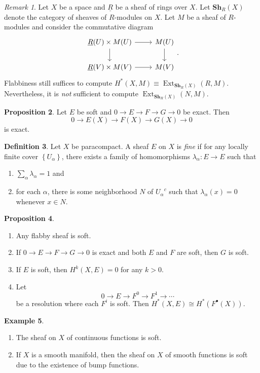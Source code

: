 \documentclass[10pt,letterpaper,cm]{nupset}
\theoremstyle{definition}
\newtheorem{definition}{Definition}[subsection]
\newtheorem{exmp}[definition]{Example}
\theoremstyle{theorem}
\newtheorem{prop}[definition]{Proposition}
\theoremstyle{remark}
\newtheorem{remark}[definition]{Remark}
\newcommand{\1}{\mathbb{1}}
\newcommand{\0}{\vec 0}
\DeclareMathOperator{\ext}{Ext}
\begin{document}
\begin{remark}
Let $X$ be a space and $\underline{R}$ be a sheaf of rings over $X$. Let $\mathbf{Sh}_R(X)$ denote the category of sheaves of $R$-modules on $X$. Let $M$ be a sheaf of $R$-modules and consider the commutative diagram
\[
\begin{tikzcd}
\underline{R}(U) \times M(U) \arrow[r] \arrow[d] &  M(U) \arrow[d] \\
 \underline{R}(V) \times M(V) \arrow[r]          & M(V)           
\end{tikzcd}
.\]
Flabbiness still suffices to compute $H^{\ast}(X, M) \equiv \ext_{\mathbf{Sh}_R(X)}(R, M)$. Nevertheless, it is \emph{not} sufficient to compute $\ext_{\mathbf{Sh}_R(X)}(N, M)$.
\end{remark}

\begin{prop}
Let $E$ be soft and $0 \to E \to F \to G \to 0$ be exact. Then $$0 \to E(X) \to F(X) \to G(X) \to 0$$ is exact.
\end{prop}

\begin{definition}
Let $X$ be paracompact. A sheaf $E$ on $X$ is \textit{fine} if for any locally finite cover $\left\{U_{\alpha}\right\}$, there exists a family of homomorphisms $\lambda_{\alpha} : E \to E$ such that 
\begin{enumerate}[label=(\roman*)]
\item $\sum_{\alpha} \lambda_{\alpha} =1$ and
\item for each $\alpha$, there is some neighborhood $N$ of ${U_{\alpha}}^c$ such that $\lambda_{\alpha}(x) =0$ whenever $x \in N$.
\end{enumerate}
\end{definition}

\begin{prop} $ $
\begin{enumerate}
\item Any flabby sheaf is soft.
\item If $0 \to E \to F \to G \to 0$ is exact and both $E$ and $F$ are soft, then $G$ is soft.
\item If $E$ is soft, then $H^k(X, E) =0$ for any $k >0$.
\item Let $$0 \to E \to F^0 \to F^1 \to \cdots$$ be a resolution where each $F^i$ is soft. Then $H^{\ast}(X, E) \cong H^{\ast}(F^{\bullet}(X))$.
\end{enumerate}
\end{prop}

\begin{exmp} $ $
\begin{enumerate}
\item The sheaf on $X$ of continuous functions is soft.
\item If $X$ is a smooth manifold, then the sheaf on $X$ of smooth functions is soft due to the existence of bump functions.
\end{enumerate}
\end{exmp}
\end{document}
